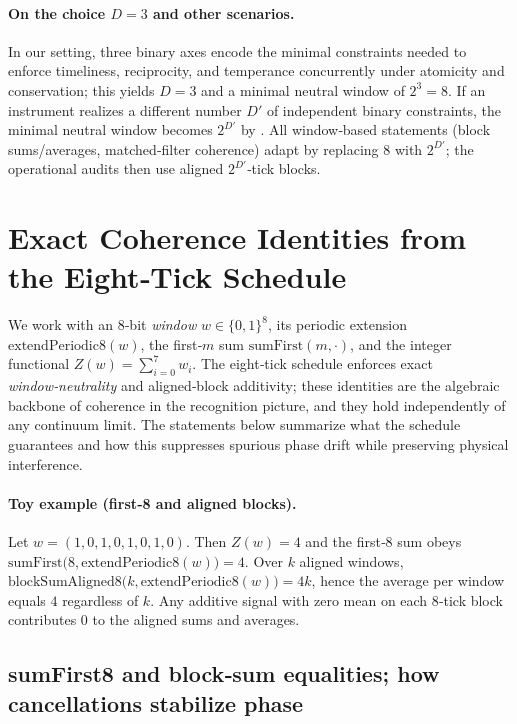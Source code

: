 \documentclass[12pt,a4paper]{article}
\theoremstyle{definition}
\theoremstyle{remark}
\begin{document}
\paragraph{On the choice $D=3$ and other scenarios.}
In our setting, three binary axes encode the minimal constraints needed to enforce timeliness, reciprocity, and temperance concurrently under atomicity and conservation; this yields $D=3$ and a minimal neutral window of $2^3=8$. If an instrument realizes a different number $D'$ of independent binary constraints, the minimal neutral window becomes $2^{D'}$ by . All window‑based statements (block sums/averages, matched‑filter coherence) adapt by replacing $8$ with $2^{D'}$; the operational audits then use aligned $2^{D'}$‑tick blocks.

\section{Exact Coherence Identities from the Eight‑Tick Schedule}
\label{sec:coherence-identities}

We work with an 8‑bit \emph{window} \(w\in\{0,1\}^{8}\), its periodic extension \(\mathrm{extendPeriodic8}(w)\), the first‑\(m\) sum \(\mathrm{sumFirst}(m,\cdot)\), and the integer functional \(Z(w)=\sum_{i=0}^{7} w_i\). The eight‑tick schedule enforces exact \emph{window‑neutrality} and aligned‑block additivity; these identities are the algebraic backbone of coherence in the recognition picture, and they hold independently of any continuum limit. The statements below summarize what the schedule guarantees and how this suppresses spurious phase drift while preserving physical interference.

\paragraph{Toy example (first‑8 and aligned blocks).}
Let $w=(1,0,1,0,1,0,1,0)$. Then $Z(w)=4$ and the first‑8 sum obeys $\mathrm{sumFirst}\big(8,\mathrm{extendPeriodic8}(w)\big)=4$. Over $k$ aligned windows, $\mathrm{blockSumAligned8}\big(k,\mathrm{extendPeriodic8}(w)\big)=4k$, hence the average per window equals $4$ regardless of $k$. Any additive signal with zero mean on each 8‑tick block contributes $0$ to the aligned sums and averages.

\subsection{sumFirst8 and block‑sum equalities; how cancellations stabilize phase}
\label{sec:sum-block}
\end{document}
